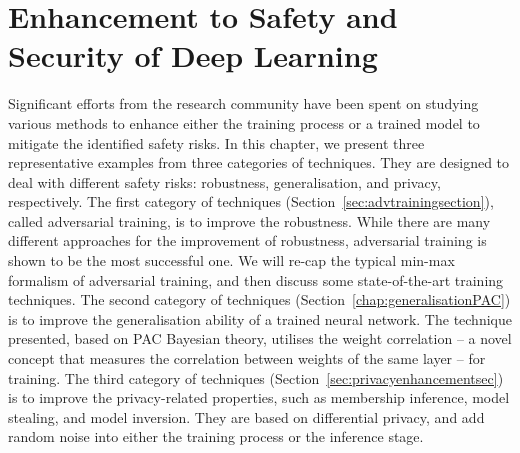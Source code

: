 
\chapter{Enhancement to Safety and Security of Deep Learning}\label{chap:advtraining}

Significant efforts from the research community have been spent on studying various methods to enhance either the training process or a trained model to mitigate the identified safety risks. In this chapter, we present three representative examples from three categories of techniques. They are designed to deal with different safety risks: robustness, generalisation, and privacy, respectively.  
%
The first category of techniques (Section~\ref{sec:advtrainingsection}), called adversarial training, is to improve the robustness. While there are many different approaches for the improvement of robustness, adversarial training is shown to be the most successful one. We will re-cap the typical min-max formalism of adversarial training, and then discuss some state-of-the-art training techniques. 
%
The second category of techniques (Section~\ref{chap:generalisationPAC}) is to improve the generalisation ability of a trained neural network. The technique presented, based on PAC Bayesian theory, utilises the weight correlation -- a novel concept that measures the correlation between weights of the same layer -- for training. 
%
The third category of techniques (Section~\ref{sec:privacyenhancementsec}) is to improve the privacy-related properties, such as membership inference, model stealing, and model inversion. They are based on differential privacy, and add random noise into either the training process or the inference stage. 








